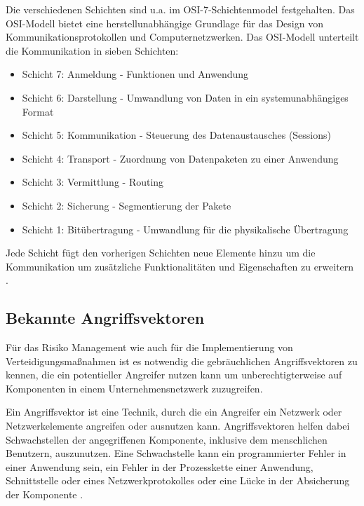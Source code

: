 Die verschiedenen Schichten sind u.a. im OSI-7-Schichtenmodel festgehalten.
Das OSI-Modell bietet eine herstellunabhängige Grundlage für das Design von Kommunikationsprotokollen und Computernetzwerken. Das OSI-Modell unterteilt die Kommunikation in sieben Schichten:
\begin{itemize}
\item Schicht 7: Anmeldung - Funktionen und Anwendung
\item Schicht 6: Darstellung - Umwandlung von Daten in ein systemunabhängiges Format
\item Schicht 5: Kommunikation - Steuerung des Datenaustausches (Sessions)
\item Schicht 4: Transport - Zuordnung von Datenpaketen zu einer Anwendung
\item Schicht 3: Vermittlung - Routing
\item Schicht 2: Sicherung - Segmentierung der Pakete 
\item Schicht 1: Bitübertragung - Umwandlung für die physikalische Übertragung
\end{itemize}

Jede Schicht fügt den vorherigen Schichten neue Elemente hinzu um die Kommunikation um zusätzliche Funktionalitäten und Eigenschaften zu erweitern \citep{OSI1}. 



\subsection{Bekannte Angriffsvektoren}
Für das Risiko Management wie auch für die Implementierung von Verteidigungsmaßnahmen ist es notwendig die gebräuchlichen Angriffsvektoren zu kennen, die ein potentieller Angreifer nutzen kann um unberechtigterweise auf Komponenten in einem Unternehmensnetzwerk zuzugreifen. 

Ein Angriffsvektor ist eine Technik, durch die ein Angreifer ein Netzwerk oder Netzwerkelemente angreifen oder ausnutzen kann. Angriffsvektoren helfen dabei Schwachstellen der angegriffenen Komponente, inklusive dem menschlichen Benutzern, auszunutzen. Eine Schwachstelle kann ein programmierter Fehler in einer Anwendung sein, ein Fehler in der Prozesskette einer Anwendung, Schnittstelle oder eines Netzwerkprotokolles oder eine Lücke in der Absicherung der Komponente \citep{AttackVector1}. 


